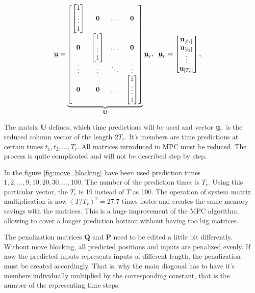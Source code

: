\documentclass[a4paper,11pt,titlepage]{article}
\newcommand{\uvec}{\textbf{\underline{u}}}
\newcommand{\urvec}{\textbf{\underline{u}}_r}
\newcommand{\macU}{\textbf{U}}
\begin{document}
\begin{equation}
\uvec = \underbrace{\begin{bmatrix}
\begin{bmatrix}
1\\
\vdots\\
1
\end{bmatrix} & \textbf{0} & \hdots & \textbf{0} \\
\textbf{0} & \begin{bmatrix}
1\\
\vdots\\
1
\end{bmatrix} & \hdots & \textbf{0}\\
\vdots & \vdots & \ddots & \vdots \\
\textbf{0} & \textbf{0} & \hdots & \begin{bmatrix}
1\\
\vdots\\
1
\end{bmatrix}
\end{bmatrix}}_{\textbf{U}}\urvec, \;\;
\urvec = \begin{bmatrix}
\textbf{u}_{[t_1]} \\
\textbf{u}_{[t_2]} \\
\vdots \\
\textbf{u}_{[T_r]}
\end{bmatrix},
\label{eq:moveblocking_example}
\end{equation}

The matrix $\macU$ defines, which time predictions will be used and vector $\urvec$ is the reduced column vector of the length $2T_r$. It's members are time predictions at certain times $t_1, t_2, ..., T_r$. All matrices introduced in MPC must be reduced. The process is quite complicated and will not be described step by step. 

In the figure \ref{fig:move_blocking} have been used prediction times $1, 2, ..., 9, 10, 20, 30, ..., 100$. The number of the prediction times is $T_r$. Using this particular vector, the $T_r$ is 19 instead of $T$ as 100. The operation of system matrix multiplication is now $(T/T_r)^2 = 27.7$ times faster and creates the same memory savings with the matrices. This is a huge improvement of the MPC algorithm, allowing to cover a longer prediction horizon without having too big matrices.

The penalization matrices $\textbf{Q}$ and $\textbf{P}$ need to be edited a little bit differently. Without move blocking, all predicted positions and inputs are penalized evenly. If now the predicted inputs represents inputs of different length, the penalization must be created accordingly. That is, why the main diagonal has to have it's members individually multiplied by the corresponding constant, that is the number of the representing time steps. 
\end{document}
